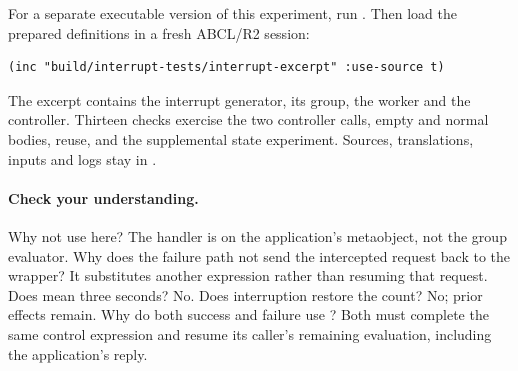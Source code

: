 For a separate executable version of this experiment, run
. Then load the prepared definitions
in a fresh ABCL/R2 session:

\begin{codeblock}
\begin{lstlisting}
(inc "build/interrupt-tests/interrupt-excerpt" :use-source t)
\end{lstlisting}
\end{codeblock}

The excerpt contains the interrupt generator, its group, the worker and
the controller. Thirteen checks exercise the two controller calls,
empty and normal bodies, reuse, and the supplemental state experiment.
Sources, translations, inputs and logs stay in
.

\paragraph{Check your understanding.}
Why not use  here? The handler is on the application's
metaobject, not the group evaluator. Why does the failure path not send
the intercepted request back to the wrapper? It substitutes another
expression rather than resuming that request. Does  mean
three seconds? No. Does interruption restore the count? No; prior
effects remain. Why do both success and failure use ? Both
must complete the same control expression and resume its caller's
remaining evaluation, including the application's reply.

